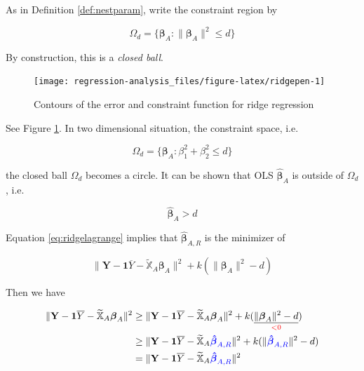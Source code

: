 \documentclass[]{book}
\theoremstyle{definition}
\theoremstyle{definition}
\theoremstyle{definition}
\theoremstyle{remark}
\begin{document}
As in Definition \ref{def:nestparam}, write the constraint region by

\[\Omega_d = \{ \boldsymbol\beta_A : \lVert \boldsymbol\beta_A \rVert^2 \le d \}\]

By construction, this is a \emph{closed ball}.

\begin{figure}[H]

{\centering \texttt{[image: regression-analysis\_files/figure-latex/ridgepen-1]} 

}

\caption{Contours of the error and constraint function for ridge regression}\label{fig:ridgepen}
\end{figure}

See Figure \ref{fig:ridgepen}. In two dimensional situation, the constraint space, i.e.

\[\Omega_d = \{ \boldsymbol\beta_A : \beta_1^2 + \beta_2^2 \le d \}\]

the closed ball \(\Omega_d\) becomes a circle. It can be shown that OLS \(\boldsymbol{\hat\beta}_{A}\) is outside of \(\Omega_d\), i.e.

\[\boldsymbol{\hat\beta}_{A} > d\]

Equation \eqref{eq:ridgelagrange} implies that \(\boldsymbol{\hat\beta}_{A, R}\) is the minimizer of

\[\lVert \mathbf{Y} - \mathbf{1} \overline{Y} - \widetilde{\mathbb{X}}_A \boldsymbol\beta_A \rVert^2 + k ( \lVert \boldsymbol\beta_A \rVert^2 - d)\]

Then we have

\begin{equation*}
  \begin{split}
    \lVert \mathbf{Y} - \mathbf{1} \overline{Y} - \widetilde{\mathbb{X}}_A \boldsymbol\beta_A \rVert^2 & \ge \lVert \mathbf{Y} - \mathbf{1} \overline{Y} - \widetilde{\mathbb{X}}_A \boldsymbol\beta_A \rVert^2 + k ( \underset{\color{red}{< 0}}{\underline{\lVert \boldsymbol\beta_A \rVert^2 - d}} ) \\
    & \ge \lVert \mathbf{Y} - \mathbf{1} \overline{Y} - \widetilde{\mathbb{X}}_A {\color{blue}{\boldsymbol{\hat\beta}_{A, R}}} \rVert^2 + k ( \lVert {\color{blue}{\boldsymbol{\hat\beta}_{A, R}}} \rVert^2 - d) \\
    & = \lVert \mathbf{Y} - \mathbf{1} \overline{Y} - \widetilde{\mathbb{X}}_A {\color{blue}{\boldsymbol{\hat\beta}_{A, R}}} \rVert^2
  \end{split}
\end{equation*}
\end{document}
